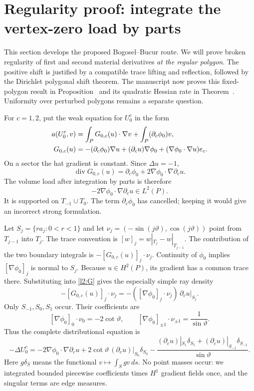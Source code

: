 \section{Regularity proof: integrate the vertex-zero load by parts}
\label{l2:rayproof}
This section develops the proposed Bogosel--Bucur route. We will prove
broken regularity of first and second material derivatives \emph{at the
regular polygon}. The positive shift is justified by a compatible trace
lifting and reflection, followed by the Dirichlet polygonal shift theorem.
The manuscript now proves this fixed-polygon result in
Proposition~ and its quadratic Hessian rate in
Theorem~. Uniformity over perturbed polygons remains a
separate question.

For $c=1,2$, put the weak equation for $U_0^c$ in the form
\begin{align}
 a(U_0^c,v)&=\int_P G_{0,c}(u)\cdot\nabla v
                              +\int_P(\partial_c\phi_0)v,\notag\\
 G_{0,c}(u)&=-(\partial_c\phi_0)\nabla u
            +(\partial_cu)\nabla\phi_0
            +(\nabla\phi_0\cdot\nabla u)e_c.
 \label{l2:G}
\end{align}
On a sector the hat gradient is constant. Since $\Delta u=-1$,
\[
 \operatorname{div}G_{0,c}(u)
 =\partial_c\phi_0+2\nabla\phi_0\cdot\nabla\partial_cu.
\]
The volume load after integration by parts is therefore
\begin{equation}
 -2\nabla\phi_0\cdot\nabla\partial_cu\in L^2(P).
 \label{l2:regularload}
\end{equation}
It is supported on $T_{-1}\cup T_0$. The term
$\partial_c\phi_0$ has cancelled; keeping it would give an incorrect
strong formulation.

Let $S_j=\{r a_j:0<r<1\}$ and let
$\nu_j=(-\sin(j\vartheta),\cos(j\vartheta))$ point from $T_{j-1}$ into
$T_j$. The trace convention is $[w]_j=w|_{T_j}-w|_{T_{j-1}}$.
The contribution of the two boundary integrals is
$-[G_{0,c}(u)]_j\cdot\nu_j$.
Continuity of $\phi_0$ implies $[\nabla\phi_0]_j$ is normal to $S_j$.
Because $u\in H^2(P)$, its gradient has a common trace there. Substituting
into \eqref{l2:G} gives the especially simple ray density
\begin{equation}
 -[G_{0,c}(u)]_j\cdot\nu_j
     =-([\nabla\phi_0]_j\cdot\nu_j)\,\partial_cu|_{S_j}.
 \label{l2:raydensity}
\end{equation}
Only $S_{-1},S_0,S_1$ occur. Their coefficients are
\[
 [\nabla\phi_0]_0\cdot\nu_0=-2\cot\vartheta,
 \qquad
 [\nabla\phi_0]_{\pm1}\cdot\nu_{\pm1}=\frac1{\sin\vartheta}.
\]
Thus the complete distributional equation is
\begin{equation}
 -\Delta U_0^c=-2\nabla\phi_0\cdot\nabla\partial_cu
 +2\cot\vartheta\,(\partial_cu)|_{S_0}\delta_{S_0}
 -\frac{(\partial_cu)|_{S_1}\delta_{S_1}
        +(\partial_cu)|_{S_{-1}}\delta_{S_{-1}}}{\sin\vartheta}.
 \label{l2:decomposition}
\end{equation}
Here $g\delta_S$ means the functional $v\mapsto\int_Sgv\,ds$.
No point masses occur: we integrated bounded piecewise coefficients times
$H^1$ gradient fields once, and the singular terms are edge measures.

